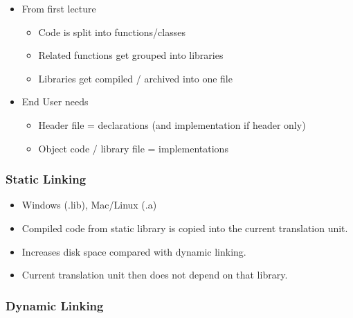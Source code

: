 \begin{itemize}
\itemsep1pt\parskip0pt
\item
  From first lecture

  \begin{itemize}
  \itemsep1pt\parskip0pt
  \item
    Code is split into functions/classes
  \item
    Related functions get grouped into libraries
  \item
    Libraries get compiled / archived into one file
  \end{itemize}
\item
  End User needs

  \begin{itemize}
  \itemsep1pt\parskip0pt
  \item
    Header file = declarations (and implementation if header only)
  \item
    Object code / library file = implementations
  \end{itemize}
\end{itemize}

\subsubsection{Static Linking}\label{static-linking}

\begin{itemize}
\itemsep1pt\parskip0pt
\item
  Windows (.lib), Mac/Linux (.a)
\item
  Compiled code from static library is copied into the current
  translation unit.
\item
  Increases disk space compared with dynamic linking.
\item
  Current translation unit then does not depend on that library.
\end{itemize}

\subsubsection{Dynamic Linking}\label{dynamic-linking}

